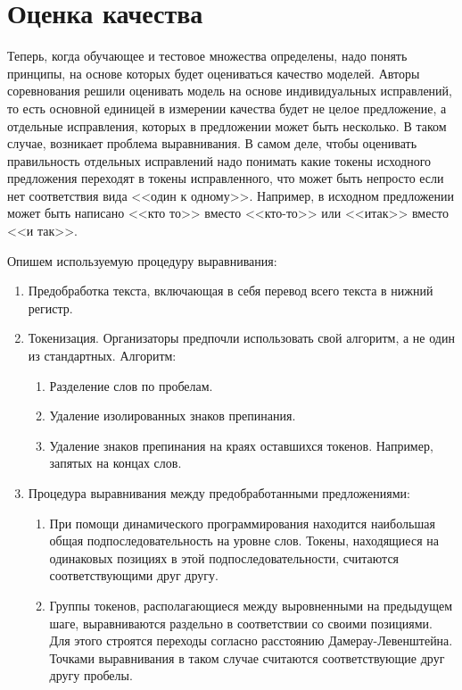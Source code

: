 \section{Оценка качества}

Теперь, когда обучающее и тестовое множества определены, надо понять принципы, на основе которых будет оцениваться качество моделей. Авторы соревнования решили оценивать модель на основе индивидуальных исправлений, то есть основной единицей в измерении качества будет не целое предложение, а отдельные исправления, которых в предложении может быть несколько. В таком случае, возникает проблема выравнивания. В самом деле, чтобы оценивать правильность отдельных исправлений надо понимать какие токены исходного предложения переходят в токены исправленного, что может быть непросто если нет соответствия вида <<один к одному>>. Например, в исходном предложении может быть написано <<кто то>> вместо <<кто-то>> или <<итак>> вместо <<и так>>.

Опишем используемую процедуру выравнивания:
\begin{enumerate}
	\item Предобработка текста, включающая в себя перевод всего текста в нижний регистр.
	\item Токенизация. Организаторы предпочли использовать свой алгоритм, а не один из стандартных. Алгоритм:
	\begin{enumerate}
		\item Разделение слов по пробелам.
		\item Удаление изолированных знаков препинания.
		\item Удаление знаков препинания на краях оставшихся токенов. Например, запятых на концах слов.
	\end{enumerate}
	\item Процедура выравнивания между предобработанными предложениями:
	\begin{enumerate}
		\item При помощи динамического программирования находится наибольшая общая подпоследовательность на уровне слов. Токены, находящиеся на одинаковых позициях в этой подпоследовательности, считаются соответствующими друг другу.
		\item Группы токенов, располагающиеся между выровненными на предыдущем шаге, выравниваются раздельно в соответствии со своими позициями. Для этого строятся переходы согласно расстоянию Дамерау-Левенштейна. Точками выравнивания в таком случае считаются соответствующие друг другу пробелы.
	\end{enumerate}
\end{enumerate}

